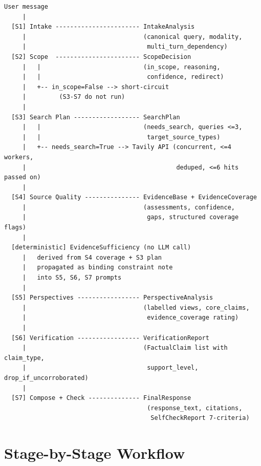 \documentclass[11pt,letterpaper]{article}
\begin{document}
\begin{center}
\begin{verbatim}
User message
     |
  [S1] Intake ----------------------- IntakeAnalysis
     |                                (canonical query, modality,
     |                                 multi_turn_dependency)
  [S2] Scope  ----------------------- ScopeDecision
     |   |                            (in_scope, reasoning,
     |   |                             confidence, redirect)
     |   +-- in_scope=False --> short-circuit
     |         (S3-S7 do not run)
     |
  [S3] Search Plan ------------------ SearchPlan
     |   |                            (needs_search, queries <=3,
     |   |                             target_source_types)
     |   +-- needs_search=True --> Tavily API (concurrent, <=4 workers,
     |                                         deduped, <=6 hits passed on)
     |
  [S4] Source Quality --------------- EvidenceBase + EvidenceCoverage
     |                                (assessments, confidence,
     |                                 gaps, structured coverage flags)
     |
  [deterministic] EvidenceSufficiency (no LLM call)
     |   derived from S4 coverage + S3 plan
     |   propagated as binding constraint note
     |   into S5, S6, S7 prompts
     |
  [S5] Perspectives ----------------- PerspectiveAnalysis
     |                                (labelled views, core_claims,
     |                                 evidence_coverage rating)
     |
  [S6] Verification ----------------- VerificationReport
     |                                (FactualClaim list with claim_type,
     |                                 support_level, drop_if_uncorroborated)
     |
  [S7] Compose + Check -------------- FinalResponse
                                       (response_text, citations,
                                        SelfCheckReport 7-criteria)
\end{verbatim}
\end{center}


\section{Stage-by-Stage Workflow}
\label{sec:stages}
\end{document}
